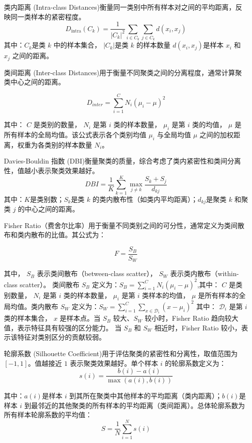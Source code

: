 类内距离 (Intra-class Distances)衡量同一类别中所有样本对之间的平均距离，反映同一类样本的紧密程度。
\[
D_{\text{intra}}(C_k) = \frac{1}{|C_k|^2} \sum_{i \in C_k} \sum_{j \in C_k} d(x_i, x_j)
\]
其中：$C_k$是类 $k$ 中的样本集合， $|C_k|$是类 $k$ 的样本数量 $d(x_i, x_j)$是样本 $x_i$ 和 $x_j$ 之间的距离。

类间距离 (Inter-class Distances)用于衡量不同聚类之间的分离程度，通常计算聚类中心之间的距离。

\[
D_{inter} = \sum_{i=1}^{C} N_i (\mu_i - \mu)^2
\]

其中：  \( C \) 是类别的数量，   \( N_i \) 是第 \( i \) 类的样本数量，  \( \mu_i \) 是第 \( i \) 类的均值， \( \mu \) 是所有样本的全局均值。该公式表示各个类别均值 \( \mu_i \) 与全局均值 \( \mu \) 之间的加权距离，权重为各类别的样本数量 \( N_i \)。

Davies-Bouldin 指数 (DBI)衡量聚类的质量，综合考虑了类内紧密性和类间分离性，值越小表示聚类效果越好。
\[
DBI = \frac{1}{K} \sum_{k=1}^K \max_{j \neq k} \frac{S_k + S_j}{d_{kj}}
\]
其中：$K$是类别数；$S_k$是类 $k$ 的类内散布性（如类内平均距离）；$d_{kj}$是聚类 $k$ 和聚类 $j$ 的中心之间的距离。




Fisher Ratio（费舍尔比率）用于衡量不同类别之间的可分性，通常定义为类间散布和类内散布的比值。其公式为：

\[
F = \frac{S_B}{S_W}
\]

其中， \( S_B \) 表示类间散布（between-class scatter），  \( S_W \) 表示类内散布（within-class scatter）。
类间散布 \( S_B \) 定义为：$S_B = \sum_{i=1}^C N_i (\mu_i - \mu)^2$,其中：  \( C \) 是类别数量，   \( N_i \) 是第 \( i \) 类的样本数量，   \( \mu_i \) 是第 \( i \) 类样本的均值，  \( \mu \) 是所有样本的全局均值。类内散布 \( S_W \) 定义为：$S_W = \sum_{i=1}^C \sum_{x \in \mathcal{D}_i} (x - \mu_i)^2 $
其中：  \( \mathcal{D}_i \) 是第 \( i \) 类的样本集合，  \( x \) 是样本点。当 \( S_B \) 较大、\( S_W \) 较小时，Fisher Ratio 趋向较大值，表示特征具有较强的区分能力。  当 \( S_B \) 和 \( S_W \) 相近时，Fisher Ratio 较小，表示该特征对类别区分的贡献较弱。


轮廓系数 (Silhouette Coefficient)用于评估聚类的紧密性和分离性，取值范围为 $[-1, 1]$。值越接近 $1$ 表示聚类效果越好。单个样本 $i$ 的轮廓系数定义为：
\[
s(i) = \frac{b(i) - a(i)}{\max(a(i), b(i))}
\]

其中：$a(i)$是样本 $i$ 到其所在聚类中其他样本的平均距离（类内距离）；$b(i)$是样本 $i$ 到最邻近的其他聚类的所有样本的平均距离（类间距离）。总体轮廓系数为所有样本轮廓系数的平均值：
\[
S = \frac{1}{N} \sum_{i=1}^N s(i)
\]



